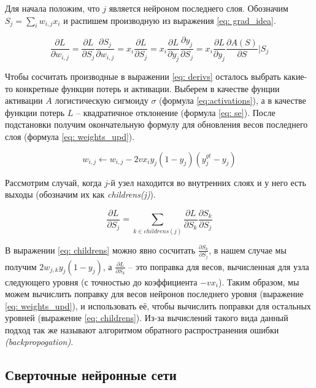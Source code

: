 Для начала положим, что $j$ является 
нейроном последнего слоя. Обозначим $S_{j} = \sum_{i} w_{i, j} x_{i}$ и
распишем производную из выражения \ref{eq: grad_idea}.

\begin{equation}\label{eq: derivs}
    \frac{\partial L}{\partial w_{i, j}} = 
    \frac{\partial L}{\partial S_j} \frac{\partial S_j}{\partial w_{i, j}} =
    x_i \frac{\partial L}{\partial S_j} =
    x_i \frac{\partial L}{\partial y_j} \frac{\partial y_j}{\partial S_j} =
    x_i \frac{\partial L}{\partial y_j}  \frac{\partial A(S)}{\partial S} | S_j
\end{equation}

Чтобы сосчитать производные в выражении \ref{eq: derivs} осталось выбрать какие-то конкретные
функции потерь и активации. Выберем в качестве фунции активации $A$ 
логистическую сигмоиду $\sigma$ (формула \ref{eq:activations}), а в качестве функции потерь
$L$ -- квадратичное отклонение (формула \ref{eq: se}). После подстановки получим
окончательную формулу для обновления весов последнего слоя (формула \ref{eq: weights_upd}).

\begin{equation}\label{eq: weights_upd}
    w_{i, j} \leftarrow w_{i, j} - 2 v x_i y_j (1 - y_j) (y^{gt}_j - y_j)
\end{equation}

Рассмотрим случай, когда $j$-й узел находится во внутренних слоях и 
у него есть выходы (обозначим их как \textit{childrens(j)}).

\begin{equation}\label{eq: childrens}
    \frac{\partial L}{\partial S_j} = 
    \sum_{k \in childrens(j)} \frac{\partial L}{\partial S_k} \frac{\partial S_k}{\partial S_j} 
\end{equation}


\indent
\indent
В выражении \ref{eq: childrens} можно явно сосчитать 
$\frac{\partial S_k}{\partial S_j}$, в нашем случае мы получим 
$2 w_{j, k} y_j (1 - y_j)$, а $\frac{\partial L}{\partial S_k}$ -- это поправка для весов, вычисленная для узла 
следующего уровня (с точностью до коэффициента $-v x_i$). Таким образом, мы можем вычислить
поправку для весов нейронов последнего уровня (выражение \ref{eq: weights_upd}), и использовать
её, чтобы вычислить поправки для остальных уровней
(выражение \ref{eq: childrens}). Из-за вычислений такого вида
 данный подход так же называют алгоритмом обратного распространения ошибки \textit{(backpropogation)}.
 

\subsection{Сверточные нейронные сети}

